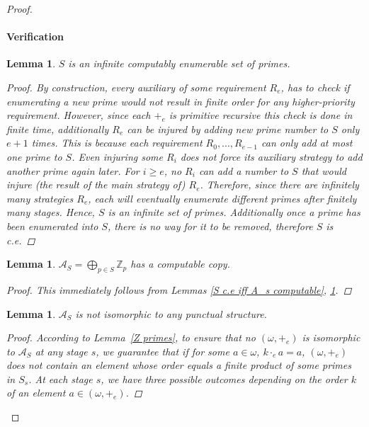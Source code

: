 \documentclass{pracalicmgr2025}
\theoremstyle{plain}            %
\newtheorem{lemma}[theorem]{Lemma}
\theoremstyle{remark}           %
\theoremstyle{definition}       %
\begin{document}
\begin{proof}
\paragraph{Verification}
\begin{lemma} \label{S is inf set of primes}
$S$ is an infinite computably enumerable set of primes.
\begin{proof}
By construction, every auxiliary of some requirement $R_e$, has to check if enumerating a new prime would not result in finite order for any higher-priority requirement. However, since each $+_e$ is primitive recursive this check is done in finite time, additionally $R_e$ can be injured by adding new prime number to $S$ only $e+1$ times. This is because each requirement $R_0, ... , R_{e-1}$ can only add at most one prime to $S$. Even injuring some $R_i$ does not force its auxiliary strategy to add another prime again later. For $i \geq e$, no $R_i$ can add a number to $S$ that would injure (the result of the main strategy of) $R_e$. Therefore, since there are infinitely many strategies $R_e$, each will eventually enumerate different primes after finitely many stages. Hence, $S$ is an infinite set of primes. Additionally once a prime has been enumerated into $S$, there is no way for it to be removed, therefore $S$ is c.e.
\end{proof}
\end{lemma}
\begin{lemma}
    $\mathcal{A}_S = \bigoplus_{p\in S} \mathbb{Z}_p$ has a computable copy.
    \begin{proof}
        This immediately follows from Lemmas \ref{S c.e iff A_s computable}, \ref{S is inf set of primes}.
    \end{proof}
        
\end{lemma}
\begin{lemma}
$\mathcal{A}_S$ is not isomorphic to any punctual structure.
\begin{proof}
According to Lemma~\ref{Z primes}, to ensure that no $(\omega, +_e)$ is isomorphic to $\mathcal{A}_S$ at any stage $s$, we guarantee that if for some $a \in \omega$, $k \cdot_e a = a$, $(\omega, +_e)$ does not contain an element whose order equals a finite product of some primes in $S_s$. At each stage $s$, we have three possible outcomes depending on the order $k$ of an element $a \in (\omega, +_e)$.


\end{proof}
\end{lemma}
\end{proof}
\end{document}

